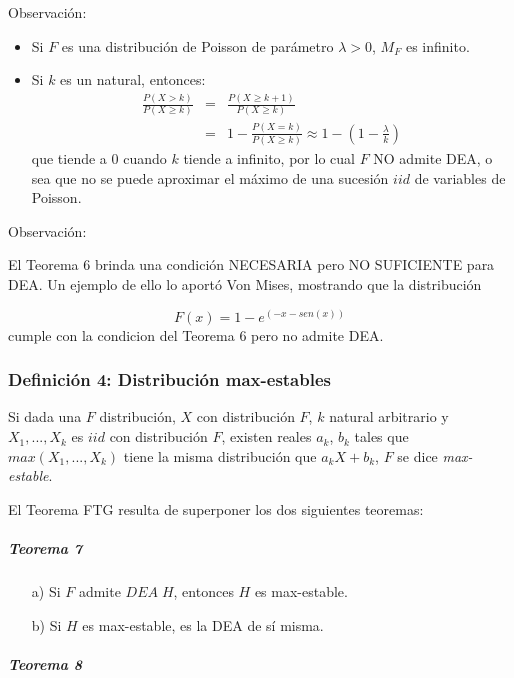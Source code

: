 \documentclass[
  12pt]{article}
\begin{document}
Observación:

\begin{itemize}
\item Si $F$ es una distribución de Poisson de parámetro $\lambda>0$, $M_F$ es infinito. 
\item Si $k$ es un natural, entonces:
\begin{eqnarray}
\frac{P(X>k)}{P(X\geq k)} &=& \frac{P(X \geq k+1)}{P(X\geq k)} \\ \nonumber
&=& 1-\frac{P(X=k)}{P(X \geq k)} \approx 1-\left(1- \frac{\lambda}{k}\right) 
\end{eqnarray}
que tiende a $0$ cuando $k$ tiende a infinito, por lo cual $F$ NO admite DEA, o sea que no se puede aproximar el máximo de una sucesión $iid$ de variables de Poisson.
\end{itemize}

Observación:

El Teorema 6 brinda una condición NECESARIA pero NO SUFICIENTE para DEA.
Un ejemplo de ello lo aportó Von Mises, mostrando que la distribución

\[F(x)= 1- e^{(-x-sen(x))}\] cumple con la condicion del Teorema 6 pero
no admite DEA.

\hypertarget{definiciuxf3n-4-distribuciuxf3n-max-estables}{%
\subsubsection{Definición 4: Distribución
max-estables}\label{definiciuxf3n-4-distribuciuxf3n-max-estables}}

Si dada una \(F\) distribución, \(X\) con distribución \(F\), \(k\)
natural arbitrario y \(X_1,...,X_k\) es \(iid\) con distribución \(F\),
existen reales \(a_k\), \(b_k\) tales que \(max(X_1,...,X_k)\) tiene la
misma distribución que \(a_k X+ b_k\), \(F\) se dice
\textit{max-estable}.

El Teorema FTG resulta de superponer los dos siguientes teoremas:

\hypertarget{teorema-7}{%
\subparagraph{Teorema 7}\label{teorema-7}}

\begin{itemize}
  \item[a)] Si $F$ admite $DEA\;H$, entonces $H$ es max-estable.
  \item[b)] Si $H$ es max-estable, es la DEA de sí misma.
\end{itemize}

\hypertarget{teorema-8}{%
\subparagraph{Teorema 8}\label{teorema-8}}
\end{document}
